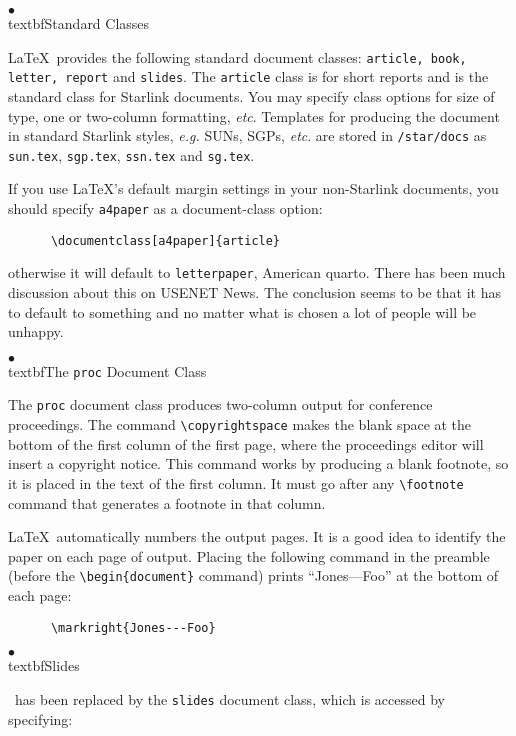 \documentclass[11pt,twoside]{article}
\begin{document}
$\bullet$ \\textbf{Standard Classes}

\LaTeX\ provides the following standard document classes:
\texttt{article, book, letter, report} and \texttt{slides}. 
The \texttt{article} class is for short reports and is the standard class
for Starlink documents.  
You may specify class options for size of type, one or two-column formatting,
\emph{etc}.
Templates for producing the document in standard Starlink styles, 
{\em e.g.} SUNs, SGPs, \emph{etc}. are stored in 
\verb+/star/docs+ as \verb+sun.tex+, \verb+sgp.tex+, \verb+ssn.tex+ and 
\verb+sg.tex+.

If you use \LaTeX's default margin settings in your non-Starlink documents,
you should specify \texttt{a4paper} as a document-class option:
\begin{verbatim}
      \documentclass[a4paper]{article}
\end{verbatim}
otherwise it will default to \texttt{letterpaper}, American quarto.  
There has been much discussion about this on USENET News.  
The conclusion seems to be that it has to default to 
something and no matter what is chosen a lot of people will be unhappy.

$\bullet$ \\textbf{The \texttt{proc} Document Class}

The \texttt{proc} document class produces two-column output for conference
proceedings.  The command \hbox{\verb|\copyrightspace|} makes the blank
space at the bottom of the first column of the first page, where the
proceedings editor will insert a copyright notice.  This command works
by producing a blank footnote, so it is placed in the text of the first
column.  It must go after any \hbox{\verb|\footnote|} command that
generates a footnote in that column.

\LaTeX\ automatically numbers the output pages.  It is a good idea 
to identify the paper on each page of output.  Placing the following command
in the preamble (before the \hbox{\verb|\begin{document}|} command)
prints ``Jones---Foo'' at the bottom of each page:  

\begin{verbatim}
      \markright{Jones---Foo}
\end{verbatim}

$\bullet$ \\textbf{Slides}

\SLITeX\ has been replaced by the \texttt{slides} document class, 
which is accessed by specifying:
\end{document}

